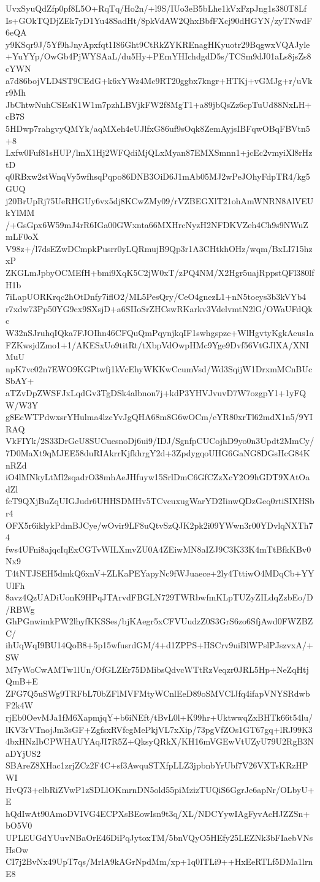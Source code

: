 UvxSyuQdZfp0pf8L5O+RqTq/Ho2n/+l9S/IUo3eB5bLhe1kVxFzpJng1s380T8Lf
Is+GOkTQDjZEk7yD1Yu48SadHt/8pkVdAW2QhxBbfFXcj90dHGYN/zyTNwdF6eQA
y9KSqr9J/5Yf9hJnyApxfqt1I86Ght9CtRkZYKREnagHKyuotr29BqgwxVQAJyle
+YuYYp/OwGb4PjWYSAaL/du5Hy+PEmYHIchdgdD5s/TCSm9dJ01aLs8jsZs8cYWN
a7d86bojVLD4ST9CEdG+k6xYWz4Mc9RT20ggbx7kngr+HTKj+vGMJg+r/uVkr9Mh
JbChtwNuhCSEsK1W1m7pzhLBVjkFW2f8MgT1+a89jbQsZz6cpTuUd88NxLH+cB7S
5HDwp7rahgvyQMYk/aqMXeh4eUJlfxG86uf9sOqk8ZemAyjsIBFqwOBqFBVtn5+8
Lxfw0Fuf81sHUP/lmX1Hj2WFQdiMjQLxMyan87EMXSmnn1+jcEc2vmyiXl8rHztD
q0RBxw2stWnqVy5wfhsqPqpo86DNB3OiD6J1mAb05MJ2wPeJOhyFdpTR4/kg5GUQ
j20BrUpRj75UeRHGUy6vx5dj8KCwZMy09/rVZBEGXlT21ohAmWNRN8AlVEUkYlMM
/+GsGpx6W59mJ4rR6IGa00GWxnta66MXHrcNyzH2NFDKVZeh4Ch9s9NWuZmLF0oX
V98z+/l7dsEZwDCmpkPusrr0yLQRmujB9Qp3r1A3CHtkhOHz/wqm/BxLI715hzxP
ZKGLmJpbyOCMEfH+bmi9XqK5C2jW0xT/zPQ4NM/X2Hgr5uajRppstQFl380lfH1b
7iLapUORKrqc2hOtDnfy7iflO2/ML5PesQry/CeO4gnezL1+nN5toeys3b3kVYb4
r7xdw73Pp50YG9cx9SXsjD+a6SIIoSrZHCswRKarkv3VdelvmtN2lG/OWaUFdQkc
W32nSJruhqIQka7FJOIhn46CFQuQmPqynjkqIF1swhgspzc+WlHgvtyKgkAeus1a
FZKwsjdZmo1+1/AKESxUo9titRt/tXbpVdOwpHMc9Yge9Dvf56VtGJlXA/XNIMuU
npK7vc02n7EWO9KGPtwfj1kVcEhyWKKwCcumVsd/Wd3SqijW1DrxmMCnBUcSbAY+
aTZvDpZWSFJxLqdGv3TgDSk4albnon7j+kdP3YHVJvuvD7W7ozgpY1+1yFQW/W3Y
g8EcWTPdwxsrYHulma4lzcYvJgQHA68m8G6wOCm/eYR80xrTl62mdX1n5/9YIRAQ
VkFIYk/2S33DrGcU8SUCuesnoDj6ui9/IDJ/SgnfpCUCojhD9yo0n3Updt2MmCy/
7D0MaXt9qMJEE58duRIAkrrKjfkhrgY2d+3ZpdygqoUHG6GaNG8DGsHcG84KnRZd
iO4lMNkyLtMl2sqadrO38mhAeJHfuyw15SrlDmC6GfCZzXcY2O9hGDT9XAtOadZl
fcT9QXjBuZqUIGJudr6UHHSDMHv5TCvcuxugWarYD2IinwQDzGeq0rtiSIXHSbr4
OFX5r6iklykPdmBJCye/wOvir9LF8uQtvSzQJK2pk2i09YWwn3r00YDvlqNXTh74
fws4UFni8ajqcIqExCGTvWILXmvZU0A4ZEiwMN8aIZJ9C3K33K4mTtBfkKBv0Nx9
T4tNTJSEH5dmkQ6xnV+ZLKaPEYapyNc9fWJuaece+2ly4TttiwO4MDqCb+YYUlFh
8avz4QzUADiUonK9HPqJTArvdFBGLN729TWRbwfmKLpTUZyZILdqZzbEo/D/RBWg
GhPGnwimkPW2lhyfKKSSes/bjKAegr5xCFVUudzZ0S3GrS6zo6SfjAwd0FWZBZC/
ihUqWqI9BU14QoB8+5p15wfusrdGM/4+d1ZPPS+HSCrv9uiBlWPslPJszvxA/+SW
M7yWoCwAMTw1lUn/OfGLZEr75DMibsQdvcWTtRzVeqzr0JRL5Hp+NeZqHtjQmB+E
ZFG7Q5uSWg9TRFbL70bZFlMVFMtyWCnlEeD89oSMVCIJfq4ifapVNYSRdwbF2k4W
rjEb0OevMJa1fM6XapmjqY+b6iNEft/tBvL0l+K99hr+UktwwqZxBHTk66t54lu/
lKV3rVTnojJm3sGF+ZgfsxRVfcgMePkjVL7xXip/73pgVfZOs1GT67gq+lRJ99K3
4bxHNzIbCPWHAUYAqJI7R5Z+QksyQRkX/KH16mVGEwVtUZyU79U2RgB3NaDYjUS2
SBAreZ8XHac1zrjZCz2F4C+sf3AwquSTXfpLLZ3jpbnbYrUbf7V26VXTsKRzHPWI
HvQ73+elbRiZVwP1zSDLlOKmrnDN5old55piMzizTUQiS6GgrJe6apNr/OLbyU+E
hQdIwAt90AmoDVIVG4ECPXsBEowIsn9t3q/XL/NDCYywIAgFyvAcHJZZSn+bO5V0
UPLEUGdYUuvNBaOrE46DiPqJytoxTM/5bnVQyO5HEfy25LEZNk3bFIaebVNsHsOw
CI7j2BvNx49UpT7qs/MrlA9kAGrNpdMm/xp+1q0ITLi9++HxEeRTLf5DMa1lrnE8
